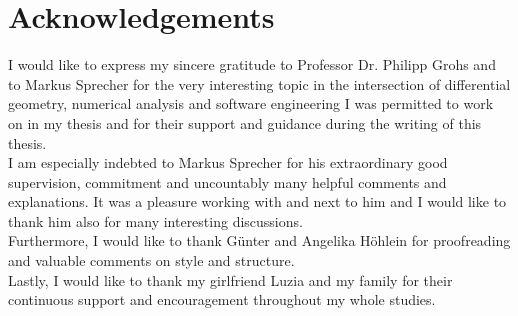 \chapter*{Acknowledgements}
\thispagestyle{empty}

I would like to express my sincere gratitude to Professor Dr. Philipp Grohs and to Markus Sprecher for the very interesting
topic in the intersection of differential geometry, numerical analysis and software engineering
I was permitted to work on in my thesis and for their support and guidance during the writing of this thesis.\\

I am especially indebted to Markus Sprecher for his extraordinary good supervision, commitment and uncountably many helpful
comments and explanations. It was a pleasure working with and next to him and I would like to thank him also for many
interesting discussions.\\

Furthermore, I would like to thank Günter and Angelika Höhlein for proofreading and valuable comments on style and
structure.\\

Lastly, I would like to thank my girlfriend Luzia and my family for their continuous support and encouragement throughout my 
whole studies.




\clearpage